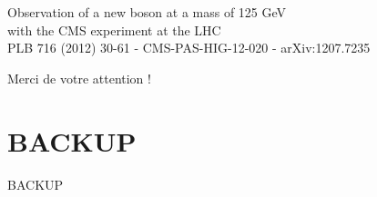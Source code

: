 \documentclass[usenames,dvipsnames]{beamer}
\begin{document}
\begin{frame}
\vspace{-.5cm}
\begin{center}
Observation of a new boson at a mass of 125 GeV\\with the CMS experiment at the LHC
\\\tiny
PLB 716 (2012) 30-61 - CMS-PAS-HIG-12-020 - arXiv:1207.7235
\end{center}
\vspace{-.8cm}
\begin{center}
Merci de votre attention !
\end{center}
\end{frame}

\appendix
\section{BACKUP}
\begin{frame}
\begin{center}
\LARGE
BACKUP
\end{center}
\end{frame}

\begin{frame}
\tableofcontents
\end{frame}










\end{document}
